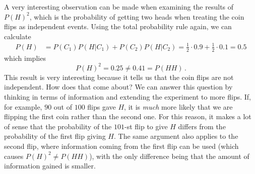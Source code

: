 \begin{ex}
A very interesting observation can be made when examining the results of $P(H)^2$, which is the probability of getting two heads when treating the coin flips as independent events. Using the total probability rule again, we can calculate
\begin{align*}
P(H) &= P(C_1) P(H | C_1) + P(C_2) P(H | C_2) = \frac{1}{2} \cdot 0.9 + \frac{1}{2} \cdot 0.1 = 0.5
\end{align*}
which implies
\begin{equation*}
P(H)^2 = 0.25 \neq 0.41 = P(HH) \, .
\end{equation*}
This result is very interesting because it tells us that the coin flips are not independent. How does that come about? We can answer this question by thinking in terms of information and extending the experiment to more flips. If, for example, $90$ out of $100$ flips gave $H$, it is \emph{much} more likely that we are flipping the first coin rather than the second one.\footnotemark{} 
For this reason, it makes a lot of sense that the probability of the $101$-st flip to give $H$ differs from the probability of the first flip giving $H$. The same argument also applies to the second flip, where information coming from the first flip can be used (which causes $P(H)^2 \neq P(HH)$), with the only difference being that the amount of information gained is smaller.


\end{ex}
